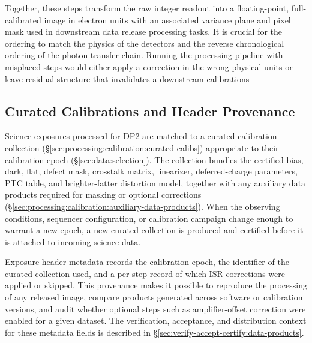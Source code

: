 Together, these steps transform the raw integer readout into a floating-point, full-calibrated image in electron units with an associated variance plane and pixel mask used in downstream data release processing tasks.
It is crucial for the ordering to match the physics of the detectors and the reverse chronological ordering of the photon transfer chain.
Running the processing pipeline with misplaced steps would either apply a correction in the wrong physical units or leave residual structure that invalidates a downstream calibrations

\subsection{Curated Calibrations and Header Provenance} \label{sec:isr-science:provenance}

Science exposures processed for DP2 are matched to a curated calibration collection (\S\ref{sec:processing:calibration:curated-calibs}) appropriate to their calibration epoch (\S\ref{sec:data:selection}).
The collection bundles the certified bias, dark, flat, defect mask, crosstalk matrix, linearizer, deferred-charge parameters, PTC table, and brighter-fatter distortion model, together with any auxiliary data products required for masking or optional corrections (\S\ref{sec:processing:calibration:auxiliary-data-products}).
When the observing conditions, sequencer configuration, or calibration campaign change enough to warrant a new epoch, a new curated collection is produced and certified before it is attached to incoming science data.

Exposure header metadata records the calibration epoch, the identifier of the curated collection used, and a per-step record of which ISR corrections were applied or skipped.
This provenance makes it possible to reproduce the processing of any released image, compare products generated across software or calibration versions, and audit whether optional steps such as amplifier-offset correction were enabled for a given dataset.
The verification, acceptance, and distribution context for these metadata fields is described in \S\ref{sec:verify-accept-certify:data-products}.
